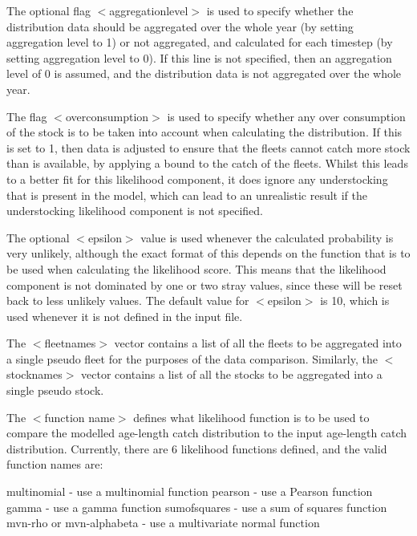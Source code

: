 \documentclass [a4paper, 10pt]{book}
\begin{document}
The optional flag $<$aggregationlevel$>$ is used to specify whether the distribution data should be aggregated over the whole year (by setting aggregation level to 1) or not aggregated, and calculated for each timestep (by setting aggregation level to 0).  If this line is not specified, then an aggregation level of 0 is assumed, and the distribution data is not aggregated over the whole year.

\bigskip
The flag $<$overconsumption$>$ is used to specify whether any over consumption of the stock is to be taken into account when calculating the distribution.  If this is set to 1, then data is adjusted to ensure that the fleets cannot catch more stock than is available, by applying a bound to the catch of the fleets.  Whilst this leads to a better fit for this likelihood component, it does ignore any understocking that is present in the model, which can lead to an unrealistic result if the understocking likelihood component is not specified.

\bigskip
The optional $<$epsilon$>$ value is used whenever the calculated probability is very unlikely, although the exact format of this depends on the function that is to be used when calculating the likelihood score.  This means that the likelihood component is not dominated by one or two stray values, since these will be reset back to less unlikely values.  The default value for $<$epsilon$>$ is 10, which is used whenever it is not defined in the input file.

\bigskip
The $<$fleetnames$>$ vector contains a list of all the fleets to be aggregated into a single pseudo fleet for the purposes of the data comparison.  Similarly, the $<$stocknames$>$ vector contains a list of all the stocks to be aggregated into a single pseudo stock.

\bigskip
The $<$function name$>$ defines what likelihood function is to be used to compare the modelled age-length catch distribution to the input age-length catch distribution.  Currently, there are 6 likelihood functions defined, and the valid function names are:

\bigskip
multinomial - use a multinomial function\newline
pearson - use a Pearson function\newline
gamma - use a gamma function\newline
sumofsquares - use a sum of squares function\newline
mvn-rho or mvn-alphabeta - use a multivariate normal function
\end{document}

